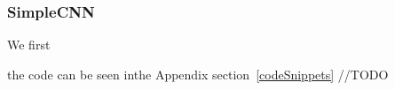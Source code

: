 \subsubsection{SimpleCNN}\label{simplecnn}

We first 

the code can be seen inthe Appendix section~\ref{codeSnippets}
//TODO